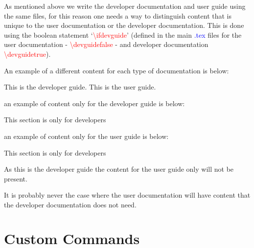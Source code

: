 As mentioned above we write the developer documentation and user guide using the same files, for this reason one needs a way to distinguish content that is unique to the user documentation or the developer documentation. This is done using the boolean statement `\textcolor{red}{\textbackslash{ifdevguide}}' (defined in the main \textcolor{blue}{.tex} files for the user documentation - \textcolor{red}{\textbackslash{devguidefalse}} - and developer documentation \textcolor{red}{\textbackslash{devguidetrue}}). 

\noindent An example of a different content for each type of documentation is below:
\begin{latexbox}
\ifdevguide
This is the developer guide.
\else
This is the user guide.
\fi
\end{latexbox}

\noindent an example of content only for the developer guide is below:
\begin{latexbox}
\ifdevguide
This section is only for developers
\fi
\end{latexbox}

\noindent an example of content only for the user guide is below:
\begin{latexbox}
\ifdevguide
\else
This section is only for developers
\fi
\end{latexbox}
\begin{note}
As this is the developer guide the content for the user guide only will not be present.
\end{note}
\begin{note}
It is probably never the case where the user documentation will have content that the developer documentation does not need.
\end{note}


\clearpage
\newpage
\section{Custom Commands}
\label{ch:documentation:commands}

